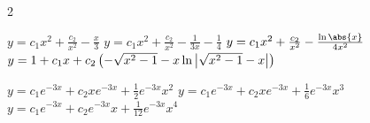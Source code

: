 \begin{multicols}{2}\scriptsize
	\begin{Answer}[ref={EX37}]
		\Question \label{3-7-1a}
		\begin{tasks}
			\task \(y= c_1 x^2+\frac{c_2}{x^2}-\frac{x}{3}\)
			\task \(y =c_1 x^2+\frac{c_2}{x^2}-\frac{1}{3 x}-\frac{1}{4}\)
			\task \(y= c_1 x^2+\frac{c_2}{x^2}-\frac{\ln\abs{x}}{4 x^2}\)
			\task \(y= 1+ c_1x\\+c_2 \left(-\sqrt{x^2-1}-x \ln \left|\sqrt{x^2-1}-x\right|\right)\)
		\end{tasks} 
		
		\Question \label{3-7-2a}	
		\begin{tasks}
			\task \(y=c_1 e^{-3 x}+c_2x e^{-3 x} +\frac{1}{2} e^{-3 x} x^2\)
				\task \(y=c_1 e^{-3 x}+c_2x e^{-3 x} +\frac{1}{6} e^{-3 x} x^3\)
				\task  \(y=c_1 e^{-3 x}+c_2 e^{-3 x} x+\frac{1}{12} e^{-3 x} x^4\)
				
		\end{tasks}
	\end{Answer}
\end{multicols}



